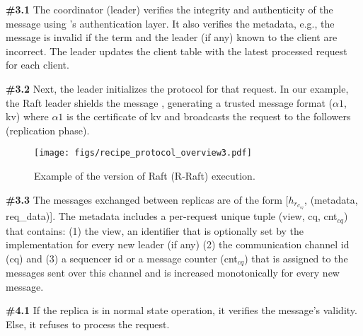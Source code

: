     
    {\bf{\#3.1}} The coordinator (leader) verifies the integrity and authenticity of the message using \projecttitle{}'s authentication layer. It also verifies the metadata, e.g., the message is invalid if the term and the leader (if any) known to the client are incorrect. The leader updates the client table with the latest processed request for each client. 
    
    {\bf{\#3.2}} Next, the leader initializes the protocol for that request. In our example, the Raft leader shields the message , generating a trusted message format ($\alpha1$, {kv}) where $\alpha1$ is the certificate of {kv} and broadcasts the request to the followers  (replication phase).  

\begin{figure*}
    \begin{center}
        \texttt{[image: figs/recipe\_protocol\_overview3.pdf]}
        \vspace{-2pt}
        \caption{Example of the \projecttitle{} version of Raft (R-Raft) execution.}
        \label{fig:raft_example}
    \end{center}
\end{figure*}

    
    {\bf{\#3.3}} The messages exchanged between replicas are of the form [$h_{r_{\sigma_{cq}}}$, (metadata, req\_data)]. The metadata includes a per-request unique tuple (view, cq, cnt$_{cq}$) that contains: (1) the view, an identifier that is optionally set by the implementation for every new leader (if any) (2) the communication channel id (cq) and (3) a sequencer id or a message counter (cnt$_{cq}$) that is assigned to the messages sent over this channel and is increased monotonically for every new message.
    

    {\bf{\#4.1}} If the replica is in normal state operation, it verifies the message's validity. Else, it refuses to process the request.
    
